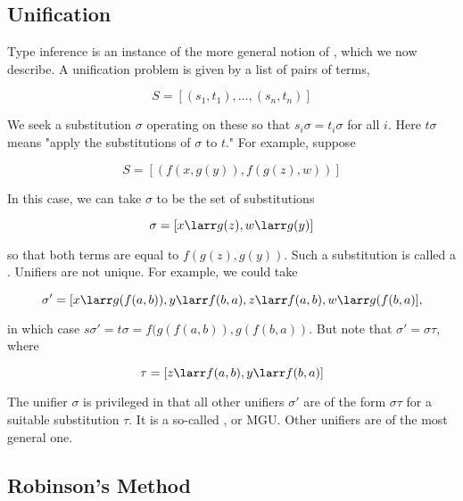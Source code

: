 \subsection{Unification}

Type inference is an instance of the more general notion of , which we now describe.  A unification problem is given by a list of pairs of terms,

\begin{equation}
S =  [(s_1, t_1), \ldots, (s_n, t_n)]
\end{equation}

We seek a substitution $\sigma$ operating on these so that $ s_i  \sigma= t_i \sigma$ for all $i$. Here $t\sigma$ means "apply the substitutions of $\sigma$ to $t$." For example, suppose 

\begin{equation}
S = [ ( f(x,g(y)), f(g(z), w) )]
\end{equation}

In this case, we can take $\sigma$ to be the set of substitutions

\begin{equation}
\sigma = [x \larr g(z), w \larr g(y)]
\end{equation}

so that both terms are equal to $f(g(z), g(y)) $. Such a substitution is called a .  Unifiers are not unique. For example, we could take 

\begin{equation}
\sigma' = [x \larr g(f(a,b)), y \larr f(b,a), z \larr f(a,b), w \larr g(f(b,a)],
\end{equation}

in which case $s\sigma' = t\sigma = f(g(f(a,b)), g(f(b,a))$. But note that $\sigma' = \sigma\tau$, 
where

\begin{equation}
\tau = [z \larr f(a,b), y \larr f(b,a)  ]
\end{equation}

The unifier $\sigma$ is privileged in that all other unifiers $\sigma'$ are of the form $\sigma\tau$ for a suitable substitution $\tau$.  It is a so-called , or MGU.  Other unifiers are  of the most general one.

\subsection{Robinson's Method}

